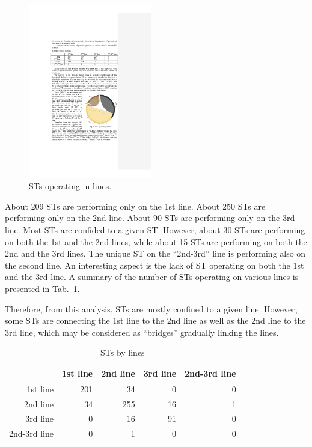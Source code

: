 \documentclass[lnbip]{svmultln}
\begin{document}
\begin{figure}
	\vspace{-20pt}
  \begin{center}
    \includegraphics[width=0.48\textwidth]{"figs/pic 18"}
  \end{center}
	\vspace{-10pt}
  \caption{STs operating in lines.}
  \label{fig:STsInLines}
	\vspace{-10pt}
\end{figure}

About 209 STs are performing only on the 1st line. About 250 STs are performing only on the 2nd line. About 90 STs are performing only on the 3rd line. Most STs are confided to a given ST. However, about 30 STs are performing on both the 1st and the 2nd lines, while about 15 STs are performing on both the 2nd and the 3rd lines. The unique ST on the ``2nd-3rd'' line is performing also on the second line. An interesting aspect is the lack of ST operating on both the 1st and the 3rd line. A summary of the number of STs operating on various lines is presented in Tab.~\ref{tab:STsByLines}.

Therefore, from this analysis, STs are mostly confined to a given line. However, some STs are connecting the 1st line to the 2nd line as well as the 2nd line to the 3rd line, which may be 
considered as ``bridges'' gradually linking the lines. 

\begin{table}
\caption{STs by lines}
\label{tab:STsByLines}
\begin{center}
\begin{tabular}{rrrrr}
& 1st line & 2nd line & 3rd line & 2nd-3rd line \\[2pt]
\hline\rule{0pt}{12pt}
1st line	   & 201 &  34 &   0 & 0\\
2nd line     &  34 & 255 &  16 & 1\\
3rd line     &   0 &  16 &  91 & 0\\
2nd-3rd line &   0 &   1 &   0 & 0\\[2pt]
\hline
\end{tabular}
\end{center}
\end{table}
\end{document}
